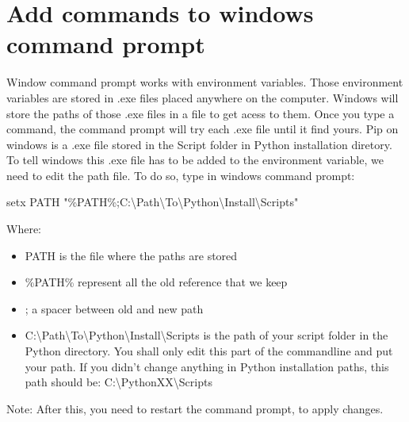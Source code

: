 \documentclass[10pt,letterpaper]{article}
\begin{document}
\section {Add commands to windows command prompt}
Window command prompt works with environment variables. Those environment variables are stored in .exe files placed anywhere on the computer. Windows will store the paths of those .exe files in a file to get acess to them. Once you type a command, the command prompt will try each .exe file until it find yours. Pip on windows is a .exe file stored in the Script folder in Python installation diretory. To tell windows this .exe file has to be added to the environment variable, we need to edit the path file.
To do so, type in windows command prompt:
\begin{mdframed}[backgroundcolor=black, fontcolor=white]
setx PATH "\%PATH\%;C:\textbackslash Path\textbackslash To\textbackslash Python\textbackslash Install\textbackslash Scripts"
\end{mdframed}
Where:
\begin{itemize}
\item PATH is the file where the paths are stored
\item \%PATH\% represent all the old reference that we keep
\item ; a spacer between old and new path
\item C:\textbackslash Path\textbackslash To\textbackslash Python\textbackslash Install\textbackslash Scripts is the path of your script folder in the Python directory. You shall only edit this part of the commandline and put your path. If you didn't change anything in Python installation paths, this path should be: C:\textbackslash PythonXX\textbackslash Scripts
\end{itemize}
\begin{itshape}
Note: After this, you need to restart the command prompt, to apply changes.
\end{itshape}
\end{document}
